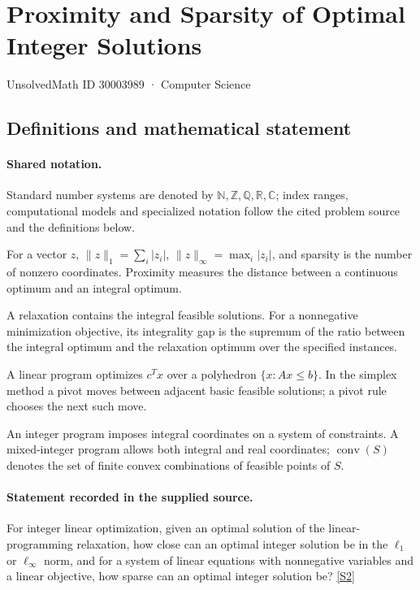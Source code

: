 \documentclass[11pt]{article}
\newcommand{\sref}[2]{\hyperlink{source:#1:#2}{[S#2]}}
\begin{document}
\setcounter{section}{30003988}
\section{Proximity and Sparsity of Optimal Integer Solutions}\label{30003989}
{\small\sffamily UnsolvedMath ID 30003989 · Computer Science}
\subsection{Definitions and mathematical statement}

\paragraph{Shared notation.}Standard number systems are denoted by $\mathbb N,\mathbb Z,\mathbb Q,\mathbb R,\mathbb C$; index ranges, computational models and specialized notation follow the cited problem source and the definitions below.


For a vector $z$, $\lVert z\rVert_1=\sum_i|z_i|$, $\lVert z\rVert_\infty=\max_i|z_i|$, and sparsity is the number of nonzero coordinates. Proximity measures the distance between a continuous optimum and an integral optimum.

A relaxation contains the integral feasible solutions. For a nonnegative minimization objective, its integrality gap is the supremum of the ratio between the integral optimum and the relaxation optimum over the specified instances.

A linear program optimizes $c^Tx$ over a polyhedron $\{x:Ax\leq b\}$. In the simplex method a pivot moves between adjacent basic feasible solutions; a pivot rule chooses the next such move.

An integer program imposes integral coordinates on a system of constraints. A mixed-integer program allows both integral and real coordinates; $\operatorname{conv}(S)$ denotes the set of finite convex combinations of feasible points of $S$.
\paragraph{Statement recorded in the supplied source.}
For integer linear optimization, given an optimal solution of the linear-programming relaxation, how close can an optimal integer solution be in the $\ell_1$ or $\ell_\infty$ norm, and for a system of linear equations with nonnegative variables and a linear objective, how sparse can an optimal integer solution be? \sref{30003989}{2}
\end{document}
